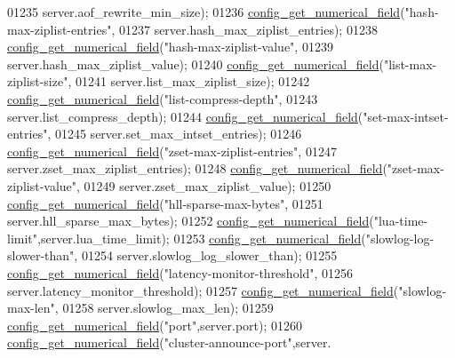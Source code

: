 \begin{DoxyCode}
{{{{{{{{{{01235             server.aof\_rewrite\_min\_size);
01236     \hyperlink{config_8c_ac10aa922264623cceca62df3262920c6}{config\_get\_numerical\_field}(\textcolor{stringliteral}{"hash-max-ziplist-entries"},
01237             server.hash\_max\_ziplist\_entries);
01238     \hyperlink{config_8c_ac10aa922264623cceca62df3262920c6}{config\_get\_numerical\_field}(\textcolor{stringliteral}{"hash-max-ziplist-value"},
01239             server.hash\_max\_ziplist\_value);
01240     \hyperlink{config_8c_ac10aa922264623cceca62df3262920c6}{config\_get\_numerical\_field}(\textcolor{stringliteral}{"list-max-ziplist-size"},
01241             server.list\_max\_ziplist\_size);
01242     \hyperlink{config_8c_ac10aa922264623cceca62df3262920c6}{config\_get\_numerical\_field}(\textcolor{stringliteral}{"list-compress-depth"},
01243             server.list\_compress\_depth);
01244     \hyperlink{config_8c_ac10aa922264623cceca62df3262920c6}{config\_get\_numerical\_field}(\textcolor{stringliteral}{"set-max-intset-entries"},
01245             server.set\_max\_intset\_entries);
01246     \hyperlink{config_8c_ac10aa922264623cceca62df3262920c6}{config\_get\_numerical\_field}(\textcolor{stringliteral}{"zset-max-ziplist-entries"},
01247             server.zset\_max\_ziplist\_entries);
01248     \hyperlink{config_8c_ac10aa922264623cceca62df3262920c6}{config\_get\_numerical\_field}(\textcolor{stringliteral}{"zset-max-ziplist-value"},
01249             server.zset\_max\_ziplist\_value);
01250     \hyperlink{config_8c_ac10aa922264623cceca62df3262920c6}{config\_get\_numerical\_field}(\textcolor{stringliteral}{"hll-sparse-max-bytes"},
01251             server.hll\_sparse\_max\_bytes);
01252     \hyperlink{config_8c_ac10aa922264623cceca62df3262920c6}{config\_get\_numerical\_field}(\textcolor{stringliteral}{"lua-time-limit"},server.lua\_time\_limit);
01253     \hyperlink{config_8c_ac10aa922264623cceca62df3262920c6}{config\_get\_numerical\_field}(\textcolor{stringliteral}{"slowlog-log-slower-than"},
01254             server.slowlog\_log\_slower\_than);
01255     \hyperlink{config_8c_ac10aa922264623cceca62df3262920c6}{config\_get\_numerical\_field}(\textcolor{stringliteral}{"latency-monitor-threshold"},
01256             server.latency\_monitor\_threshold);
01257     \hyperlink{config_8c_ac10aa922264623cceca62df3262920c6}{config\_get\_numerical\_field}(\textcolor{stringliteral}{"slowlog-max-len"},
01258             server.slowlog\_max\_len);
01259     \hyperlink{config_8c_ac10aa922264623cceca62df3262920c6}{config\_get\_numerical\_field}(\textcolor{stringliteral}{"port"},server.port);
01260     \hyperlink{config_8c_ac10aa922264623cceca62df3262920c6}{config\_get\_numerical\_field}(\textcolor{stringliteral}{"cluster-announce-port"},server.
}}}}}}}}}}
\end{DoxyCode}
